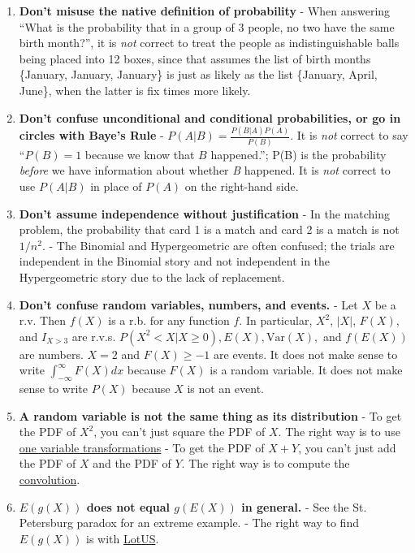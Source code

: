 \documentclass[10pt,landscape]{article}
\newcommand{\var}{\textrm{Var}}
\begin{document}
\begin{multicols}{3}
\begin{enumerate} \itemsep -.25em
\item \textbf{Don't misuse the native definition of probability}  - When answering ``What is the probability that in a group of 3 people, no two have the same birth month?'', it is \emph{not} correct to treat the people as indistinguishable balls being placed into 12 boxes, since that assumes the list of birth months \{January, January, January\} is just as likely as the list \{January, April, June\}, when the latter is fix times more likely.
\item \textbf{Don't confuse unconditional and conditional probabilities, or go in circles with Baye's Rule} - $P(A|B) = \frac{P(B|A)P(A)}{P(B)}$. It is \emph{not} correct to say ``$P(B) = 1$ because we know that $B$ happened.''; P(B) is the probability \emph{before} we have information about whether \emph{B} happened. It is \emph{not} correct to use $P(A|B)$ in place of $P(A)$ on the right-hand side.
\item \textbf{Don't assume independence without justification} - In the matching problem, the probability that card 1 is a match and card 2 is a match is not $1/n^2$. - The Binomial and Hypergeometric are often confused; the trials are independent in the Binomial story and not independent in the Hypergeometric story due to the lack of replacement.
\item \textbf{Don't confuse random variables, numbers, and events.} - Let $X$ be a r.v. Then $f(X)$ is a r.b. for any function $f$. In particular, $X^2$, $|X|$, $F(X)$, and $I_{X>3}$ are r.v.s. $P(X^2 < X | X \geq 0), E(X), \var(X), $ and $f(E(X))$ are numbers. $X = 2$ and $F(X) \geq -1$ are events. It does not make sense to write $\int_{-\infty}^\infty F(X) dx$ because $F(X)$ is a random variable. It does not make sense to write $P(X)$ because $X$ is not an event.
\item \textbf{A random variable is not the same thing as its distribution} - To get the PDF of $X^2$, you can't just square the PDF of $X$. The right way is to use \hyperref[one variable transformations]{one variable transformations} - To get the PDF of $X + Y$, you can't just add the PDF of $X$ and the PDF of $Y$. The right way is to compute the \hyperref[convolutions]{convolution}.
\item \textbf{$E(g(X))$ does not equal $g(E(X))$ in general.} - See the St. Petersburg paradox for an extreme example. - The right way to find $E(g(X))$ is with \hyperref[lotus]{LotUS}.
\end{enumerate}


\end{multicols}
\end{document}
